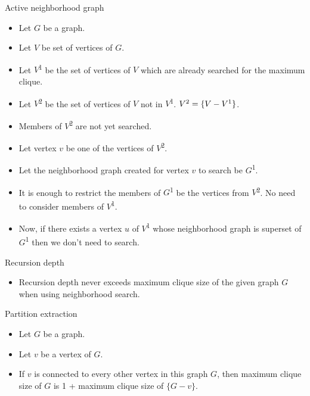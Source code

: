 \documentclass[landscape]{slides}
\begin{document}
\begin{slide}
	\begin{center}
		{\large Active neighborhood graph }
	\end{center}

	\begin{itemize}
		\setlength{\itemsep}{0pt}
		\setlength{\parskip}{0pt}
		\setlength{\parsep}{0pt}
		\item Let {$G$} be a graph.
		\item Let {$V$} be set of vertices of {$G$}.
		\item Let {$V$}\textsuperscript{1} be the set of vertices of {$V$} which are already searched for the maximum clique.
		\item Let {$V$}\textsuperscript{2} be the set of vertices of {$V$} not in {$V$}\textsuperscript{1}. {$V\textsuperscript{2} = \{V - V\textsuperscript{1}\}$}.
		\item Members of {$V$}\textsuperscript{2} are not yet searched.
		\item Let vertex {$v$} be one of the vertices of {$V$}\textsuperscript{2}.
		\item Let the neighborhood graph created for vertex {$v$} to search be {$G$}\textsuperscript{1}.
		\item It is enough to restrict the members of {$G$}\textsuperscript{1} be the vertices from {$V$}\textsuperscript{2}. No need to consider members of {$V$}\textsuperscript{1}.
		\item Now, if there exists a vertex {$u$} of {$V$}\textsuperscript{1} whose neighborhood graph is superset of {$G$}\textsuperscript{1} then we don't need to search.
	\end{itemize}
\end{slide}


\begin{slide}
	\begin{center}
		{\large Recursion depth }
	\end{center}
	
	\begin{itemize}
		\setlength{\itemsep}{0pt}
		\setlength{\parskip}{0pt}
		\setlength{\parsep}{0pt}
		\item Recursion depth never exceeds maximum clique size of the given graph $G$ when using neighborhood search.
	\end{itemize}
\end{slide}


\begin{slide}
	\begin{center}
		{\large Partition extraction }
	\end{center}

	\begin{itemize}
		\setlength{\itemsep}{0pt}
		\setlength{\parskip}{0pt}
		\setlength{\parsep}{0pt}
		\item Let {$G$} be a graph.
		\item Let {$v$} be a vertex of {$G$}.
		\item If {$v$} is connected to every other vertex in this graph {$G$}, then maximum clique size of {$G$} is 1 + maximum clique size of {$\{ G - v\}$}.
	\end{itemize}
\end{slide}
\end{document}
